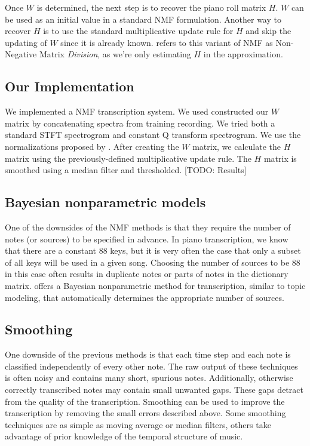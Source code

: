 \documentclass[5p]{elsarticle}
\begin{document}
Once $W$ is determined, the next step is to recover the piano roll matrix $H$. $W$ can be used as an initial value in a standard NMF formulation. Another way to recover $H$ is to use the standard multiplicative update rule for $H$ and skip the updating of $W$ since it is already known. \citet{niedermayer2008non} refers to this variant of NMF as Non-Negative Matrix \textit{Division}, as we're only estimating $H$ in the approximation.

\subsection{Our Implementation}

We implemented a NMF transcription system. We used constructed our $W$ matrix by concatenating spectra from training recording. We tried both a standard STFT spectrogram and constant Q transform spectrogram. We use the normalizations proposed by \citet{niedermayer2008non}. After creating the $W$ matrix, we calculate the $H$ matrix using the previously-defined multiplicative update rule. The $H$ matrix is smoothed using a median filter and thresholded. [TODO: Results]

\subsection{Bayesian nonparametric models}
One of the downsides of the NMF methods is that they require the number of notes (or sources) to be specified in advance. In piano transcription, we know that there are a constant 88 keys, but it is very often the case that only a subset of all keys will be used in a given song. Choosing the number of sources to be 88 in this case often results in duplicate notes or parts of notes in the dictionary matrix. \citet{blei2010bayesian} offers a Bayesian nonparametric method for transcription, similar to topic modeling, that automatically determines the appropriate number of sources.

\subsection{Smoothing}
One downside of the previous methods is that each time step and each note is classified independently of every other note. The raw output of these techniques is often noisy and contains many short, spurious notes. Additionally, otherwise correctly transcribed notes may contain small unwanted gaps. These gaps detract from the quality of the transcription. Smoothing can be used to improve the transcription by removing the small errors described above. Some smoothing techniques are as simple as moving average or median filters, others take advantage of prior knowledge of the temporal structure of music.
\end{document}
